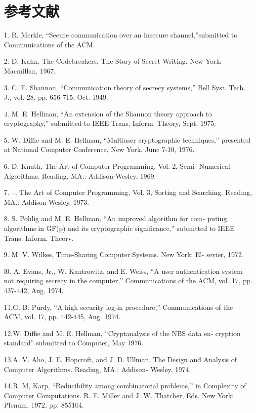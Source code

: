 \documentclass[]{article}
\begin{document}
	\section*{参考文献}
    1. R. Merkle, “Secure communication over an insecure channel,”submitted to Communications of the ACM.\par
	2. D. Kahn, The Codebreakers, The Story of Secret Writing. New
	York: Macmillan, 1967.\par
	3. C. E. Shannon, “Communication theory of secrecy systems,” Bell
	Syst. Tech. J., vol. 28, pp. 656-715, Oct. 1949.\par
	4. M. E. Hellman, “An extension of the Shannon theory approach to
	cryptography,” submitted to IEEE Trans. Inform. Theory, Sept.
	1975.\par
	5. W. Diffie and M. E. Hellman, “Multiuser cryptographic techniques,”
	presented at National Computer Conference, New York, June 7-10,
	1976.\par
	6. D. Knuth, The Art of Computer Programming, Vol. 2, Semi-
	Numerical Algorithms. Reading, MA.: Addison-Wesley, 1969.\par
	7. --, The Art of Computer Programming, Vol. 3, Sorting and
	Searching. Reading, MA.: Addison-Wesley, 1973.\par
	8. S. Pohlig and M. E. Hellman, “An improved algorithm for com-
	puting algorithms in GF(p) and its cryptographic significance,”
	submitted to IEEE Trans. Inform. Theorv.\par
	9. M. V. Wilkes, Time-Sharing Computer Systems. New York: El-
	sevier, 1972.\par
	l0. A. Evans, Jr., W. Kantrowitz, and E. Weiss, “A user authentication
	system not requiring secrecy in the computer,” Communications
	of the ACM, vol. 17, pp. 437-442, Aug. 1974.\par
	11.G. B. Purdy, “A high security log-in procedure,” Communications
	of the ACM, vol. 17, pp. 442-445, Aug. 1974.\par
	12.W. Diffie and M. E. Hellman, “Cryptanalysis of the NBS data en-
	cryption standard” submitted to Computer, May 1976.\par
	13.A. V. Aho, J. E. Hopcroft, and J. D. Ullman, The Design and
	Analysis of Computer Algorithms. Reading, MA.: Addison-
	Wesley, 1974.\par
	14.R. M, Karp, “Reducibility among combinatorial problems,” in
	Complexity of Computer Computations. R. E. Miller and J. W.
	Thatcher, Eds. New York: Plenum, 1972, pp. 855104.\par
\end{document}
